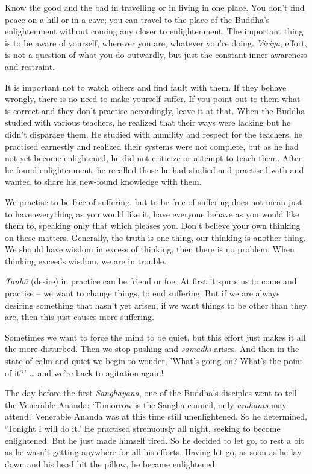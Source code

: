 Know the good and the bad in travelling or in living in one place. You
don't find peace on a hill or in a cave; you can travel to the place of
the Buddha's enlightenment without coming any closer to enlightenment.
The important thing is to be aware of yourself, wherever you are,
whatever you're doing. \emph{Viriya}, effort, is not a question of what
you do outwardly, but just the constant inner awareness and restraint.

It is important not to watch others and find fault with them. If they
behave wrongly, there is no need to make yourself suffer. If you point
out to them what is correct and they don't practise accordingly, leave
it at that. When the Buddha studied with various teachers, he realized
that their ways were lacking but he didn't disparage them. He studied
with humility and respect for the teachers, he practised earnestly and
realized their systems were not complete, but as he had not yet become
enlightened, he did not criticize or attempt to teach them. After he
found enlightenment, he recalled those he had studied and practised with
and wanted to share his new-found knowledge with them.

We practise to be free of suffering, but to be free of suffering does
not mean just to have everything as you would like it, have everyone
behave as you would like them to, speaking only that which pleases you.
Don't believe your own thinking on these matters. Generally, the truth
is one thing, our thinking is another thing. We should have wisdom in
excess of thinking, then there is no problem. When thinking exceeds
wisdom, we are in trouble.

\emph{Tanhā} (desire) in practice can be friend or foe. At first it
spurs us to come and practise -- we want to change things, to end
suffering. But if we are always desiring something that hasn't yet
arisen, if we want things to be other than they are, then this just
causes more suffering.

Sometimes we want to force the mind to be quiet, but this effort just
makes it all the more disturbed. Then we stop pushing and \emph{samādhi}
arises. And then in the state of calm and quiet we begin to wonder,
'What's going on? What's the point of it?' \ldots{} and we're back to
agitation again!

The day before the first \emph{Sanghāyanā}, one of the Buddha's
disciples went to tell the Venerable Ananda: `Tomorrow is the Sangha
council, only \emph{arahants} may attend.' Venerable Ananda was at this
time still unenlightened. So he determined, `Tonight I will do it.' He
practised strenuously all night, seeking to become enlightened. But he
just made himself tired. So he decided to let go, to rest a bit as he
wasn't getting anywhere for all his efforts. Having let go, as soon as
he lay down and his head hit the pillow, he became enlightened.

